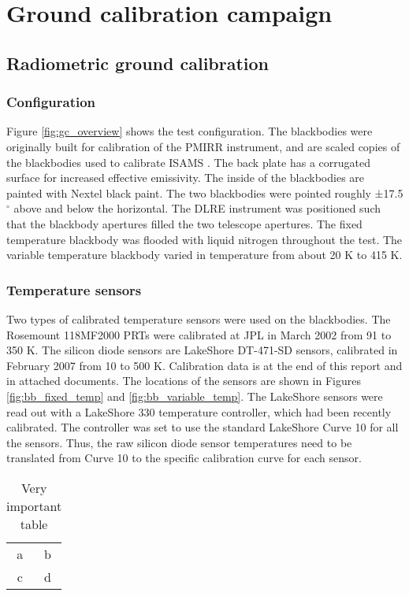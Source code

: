 \section{Ground calibration campaign}

\subsection{Radiometric ground calibration}
\subsubsection{Configuration}
Figure \ref{fig:gc_overview} shows the test configuration.
The blackbodies were originally built for calibration of the PMIRR instrument, and are scaled copies of the blackbodies used to calibrate ISAMS \cite{Nightingale_1991}. The back plate has a corrugated surface for increased effective emissivity.
The inside of the blackbodies are painted with Nextel black paint.
The two blackbodies were pointed roughly ±17.5$^\circ$ above and below the horizontal.
The DLRE instrument was positioned such that the blackbody apertures filled the two telescope apertures.
The fixed temperature blackbody was flooded with liquid nitrogen throughout the test.
The variable temperature blackbody varied in temperature from about 20 K to 415 K.

\subsubsection{Temperature sensors}
Two types of calibrated temperature sensors were used on the blackbodies.
The Rosemount 118MF2000 PRTs were calibrated at JPL in March 2002 from 91 to 350 K.
The silicon diode sensors are LakeShore DT-471-SD sensors, calibrated in February 2007 from 10 to 500 K.
Calibration data is at the end of this report and in attached documents.
The locations of the sensors are shown in Figures \ref{fig:bb_fixed_temp} and \ref{fig:bb_variable_temp}.
The LakeShore sensors were read out with a LakeShore 330 temperature controller, which had been recently calibrated.
The controller was set to use the standard LakeShore Curve 10 for all the sensors.
Thus, the raw silicon diode sensor temperatures need to be translated from Curve 10 to the specific calibration curve for each sensor.

\begin{table} 
    \begin{tabular}{ c c }
        a & b \\ 
        c & d \\ 
    \end{tabular} 
    \caption{Very important table} 
\end{table}

